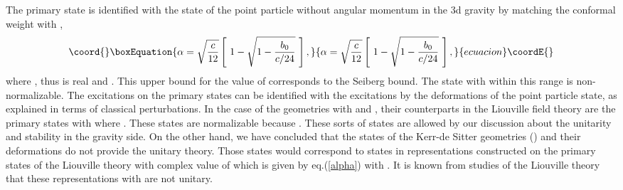 \documentclass[a4paper,11pt]{article}
\begin{document}
The primary state \myHighlight{$|\alpha\rangle\otimes|\alpha\rangle$}\coordHE{} is identified 
with the state of the point particle without angular momentum 
in the 3d gravity by matching the conformal weight with 
\coordHE{}, 
\begin{equation}\coord{}\boxEquation{
 \label{alpha}
 \alpha=\sqrt{\frac{c}{12}}\left[ \ 1-\sqrt{1-\frac{b_0}{c/24}} \ \right], 
}{
 \alpha=\sqrt{\frac{c}{12}}\left[ \ 1-\sqrt{1-\frac{b_0}{c/24}} \ \right], 
}{ecuacion}\coordE{}\end{equation}
where \coordHE{}, thus \myHighlight{$\alpha$}\coordHE{} is real 
and \coordHE{}. 
This upper bound for the value of \myHighlight{$\alpha$}\coordHE{} corresponds to the Seiberg
bound. The state with \myHighlight{$\alpha$}\coordHE{} within this range is non-normalizable.
The excitations on the primary states can be identified with 
the excitations by the deformations of the point particle state, 
as explained in terms of classical perturbations.
In the case of the geometries with \coordHE{} and \coordHE{}, 
their counterparts in the Liouville field theory are the primary states 
\myHighlight{$|\alpha\rangle\otimes|\alpha\rangle$}\coordHE{} with 
\coordHE{} where \coordHE{}.
These states are normalizable because \coordHE{}.
These sorts of states are allowed by our discussion about 
the unitarity and stability in the gravity side.
On the other hand, we have concluded that the states of the Kerr-de Sitter 
geometries (\coordHE{}) and their deformations do not provide 
the unitary theory.
Those states would correspond to states in representations constructed on 
the primary states of the Liouville theory with complex value of \myHighlight{$\alpha$}\coordHE{} 
which is given by eq.(\ref{alpha}) with 
\coordHE{}.
It is known from studies of the Liouville theory 
that these representations with \coordHE{} are 
not unitary.  
\end{document}
